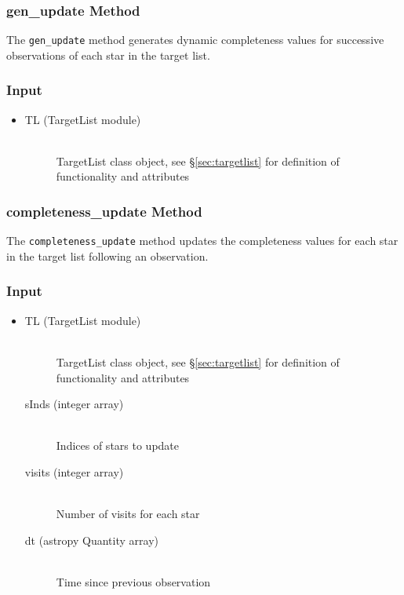 \documentclass[cleanfoot]{asme2ej}
\begin{document}
\subsubsection{gen\_update Method} \label{sec:genupdatetask}
The \verb+gen_update+ method generates dynamic completeness values for successive observations of each star in the target list.

\subsubsection*{Input}
\begin{itemize}
\item 
\begin{description}
    \item[TL (TargetList module)] \hfill \\ TargetList class object, see \S\ref{sec:targetlist} for definition of functionality and attributes
\end{description}
\end{itemize}

\subsubsection{completeness\_update Method}
\label{sec:completenessupdatetask}
The \verb+completeness_update+ method updates the completeness values for each star in the target list following an observation.

\subsubsection*{Input}
\begin{itemize}
\item 
\begin{description}
    \item[TL (TargetList module)] \hfill \\ TargetList class object, see \S\ref{sec:targetlist} for definition of functionality and attributes
    \item[sInds (integer array)] \hfill \\ Indices of stars to update
    \item[visits (integer array)] \hfill \\ Number of visits for each star
    \item[dt (astropy Quantity array)] \hfill \\ Time since previous observation
\end{description}
\end{itemize}
\end{document}
